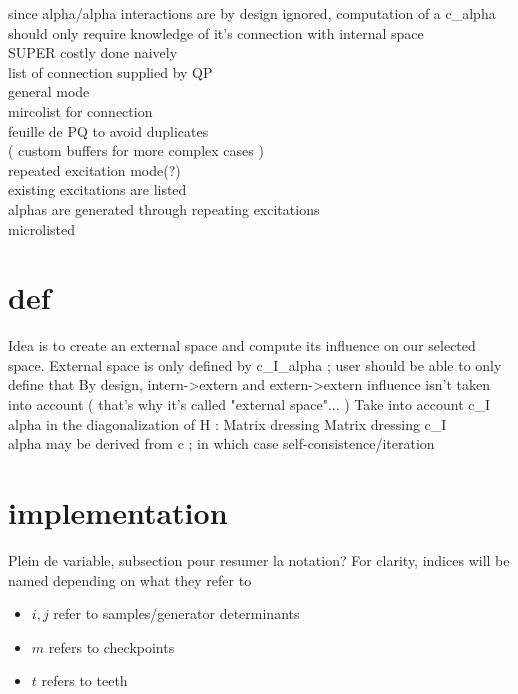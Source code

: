since alpha/alpha interactions are by design ignored, computation of a c\_alpha should only require knowledge of it's connection with internal space \\
SUPER costly done naively \\
list of connection supplied by QP \\
general mode \\
mircolist for connection \\
feuille de PQ to avoid duplicates \\
( custom buffers for more complex cases ) \\
repeated excitation mode(?)  \\
existing excitations are listed \\
alphas are generated through repeating excitations \\

microlisted \\
\section{def}
Idea is to create an external space and compute its influence on our selected space.
External space is only defined by c\_I\_alpha ; user should be able to only define that
By design, intern->extern and extern->extern influence isn't taken into account ( that's why it's called "external space"... )
Take into account c\_I\\alpha in the diagonalization of H : Matrix dressing
Matrix dressing
c\_I\\alpha may be derived from c ; in which case self-consistence/iteration


\section{implementation}
Plein de variable, subsection pour resumer la notation?
For clarity, indices will be named depending on what they refer to
\begin{itemize}
\item
$i,j$ refer to samples/generator determinants
\item
$m$ refers to checkpoints
\item
$t$ refers to teeth
\end{itemize}


